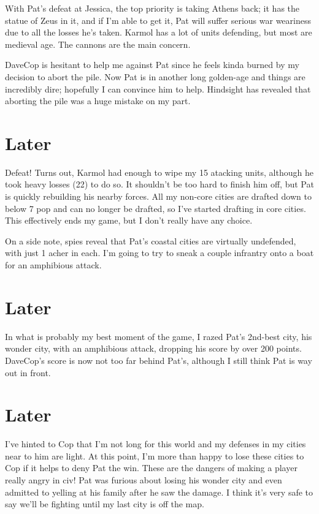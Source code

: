 \documentclass[10pt]{article}
\begin{document}
With Pat's defeat at Jessica, the top priority is taking Athens back;
it has the statue of Zeus in it, and if I'm able to get it, Pat will
suffer serious war weariness due to all the losses he's taken. Karmol
has a lot of units defending, but most are medieval age. The cannons
are the main concern.

DaveCop is hesitant to help me against Pat since he feels kinda burned
by my decision to abort the pile. Now Pat is in another long
golden-age and things are incredibly dire; hopefully I can convince
him to help. Hindsight has revealed that aborting the pile was a huge
mistake on my part.

\section*{Later}

Defeat! Turns out, Karmol had enough to wipe my 15 atacking units,
although he took heavy losses (22) to do so. It shouldn't be too hard
to finish him off, but Pat is quickly rebuilding his nearby
forces. All my non-core cities are drafted down to below 7 pop and can
no longer be drafted, so I've started drafting in core cities. This
effectively ends my game, but I don't really have any choice.

On a side note, spies reveal that Pat's coastal cities are virtually
undefended, with just 1 acher in each. I'm going to try to sneak a
couple infrantry onto a boat for an amphibious attack.

\section*{Later}

In what is probably my best moment of the game, I razed Pat's 2nd-best
city, his wonder city, with an amphibious attack, dropping his score
by over 200 points. DaveCop's score is now not too far behind Pat's,
although I still think Pat is way out in front.

\section*{Later}

I've hinted to Cop that I'm not long for this world and my defenses in
my cities near to him are light. At this point, I'm more than happy to
lose these cities to Cop if it helps to deny Pat the win. These are
the dangers of making a player really angry in civ! Pat was furious
about losing his wonder city and even admitted to yelling at his
family after he saw the damage. I think it's very safe to say we'll be
fighting until my last city is off the map.
\end{document}
